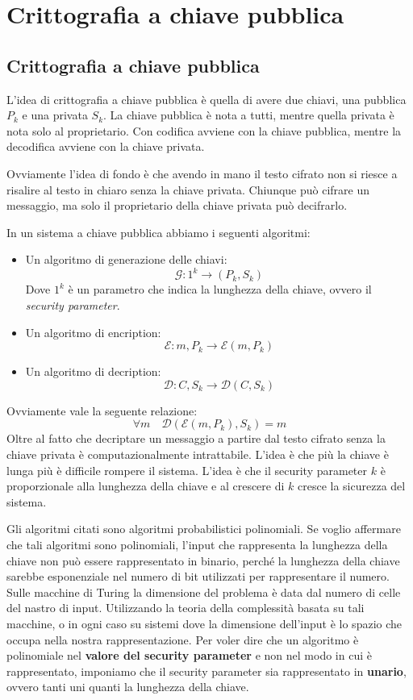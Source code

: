 \chapter{Crittografia a chiave pubblica}
\section{Crittografia a chiave pubblica}
L'idea di crittografia a chiave pubblica è quella di avere due chiavi, una
pubblica $P_k$ e una privata $S_k$. La chiave pubblica è nota a tutti, mentre
quella privata è nota solo al proprietario. 
Con codifica avviene con la chiave pubblica, mentre la decodifica avviene con la
chiave privata.

Ovviamente l'idea di fondo è che avendo in mano il testo cifrato non si riesce a
risalire al testo in chiaro senza la chiave privata. Chiunque può cifrare un
messaggio, ma solo il proprietario della chiave privata può decifrarlo.

In un sistema a chiave pubblica abbiamo i seguenti algoritmi:
\begin{itemize}
    \item Un algoritmo di generazione delle chiavi:
    \[
        \mathcal{G}: 1^k \to (P_k, S_k) 
    \]
    Dove $1^k$ è un parametro che indica la lunghezza della chiave, ovvero il \textit{security parameter}.
    \item Un algoritmo di encription:
      \[
        \mathcal{E}: m, P_k \to \mathcal{E}(m, P_k)
    \]
    \item Un algoritmo di decription:
    \[
          \mathcal{D}: C, S_k \to \mathcal{D}(C, S_k)
    \]
\end{itemize}
Ovviamente vale la seguente relazione:
\begin{equation}
    \forall m \quad \mathcal{D}(\mathcal{E}(m, P_k), S_k) = m
\end{equation}
Oltre al fatto che decriptare un messaggio a partire dal testo cifrato senza 
la chiave privata è computazionalmente intrattabile. L'idea è che più la chiave
è lunga più è difficile rompere il sistema. L'idea è che il security parameter
$k$ è proporzionale alla lunghezza della chiave e al crescere di $k$ cresce
la sicurezza del sistema.

Gli algoritmi citati sono algoritmi probabilistici polinomiali. Se voglio 
affermare che tali algoritmi sono polinomiali, l'input che rappresenta la 
lunghezza della chiave non può essere 
rappresentato in binario, perché la lunghezza della chiave sarebbe
esponenziale nel numero di bit utilizzati per rappresentare il numero. 
Sulle macchine di Turing la dimensione del problema è data dal numero di 
celle del nastro di input. Utilizzando la teoria della complessità 
basata su tali macchine, o in ogni caso su sistemi dove la dimensione 
dell'input è lo spazio che occupa nella nostra rappresentazione. Per 
voler dire che un algoritmo è polinomiale nel \textbf{valore del 
security parameter} e non nel modo in cui è rappresentato, imponiamo 
che il security parameter sia rappresentato in \textbf{unario}, ovvero 
tanti uni quanti la lunghezza della chiave.

